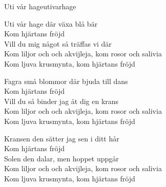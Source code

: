\begin{song}{Uti vår hage}{utivarhage}
\vspace{0.5cm}
\begin{vers}
Uti vår hage där växa blå bär\\
Kom hjärtans fröjd\\
Vill du mig något så träffas vi där\\
Kom liljor och och akvijleja, kom rosor och salivia\\
Kom ljuva krusmynta, kom hjärtans fröjd\\
\end{vers}
\begin{vers}
Fagra små blommor där bjuda till dans\\
Kom hjärtans fröjd\\
Vill du så binder jag åt dig en krans\\
Kom liljor och och akvijleja, kom rosor och salivia\\
Kom ljuva krusmynta, kom hjärtans fröjd\\
\end{vers}
\begin{vers}
Kransen den sätter jag sen i ditt hår\\
Kom hjärtans fröjd\\
Solen den dalar, men hoppet uppgår\\
Kom liljor och och akvijleja, kom rosor och salivia\\
Kom ljuva krusmynta, kom hjärtans fröjd\\
\end{vers}
\end{song}
